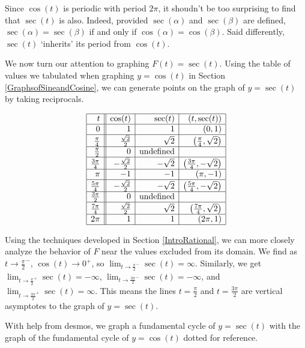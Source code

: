 \documentclass{ximera}
\begin{document}
Since $\cos(t)$ is periodic with period $2\pi$, it shoudn't be too surprising to find that $\sec(t)$ is also.  Indeed, provided $\sec(\alpha)$ and  $\sec(\beta)$ are defined, $\sec(\alpha) = \sec(\beta)$ if and only if $\cos(\alpha) = \cos(\beta)$.  Said differently,  $\sec(t)$ `inherits' its period from $\cos(t)$. 



We now turn our attention to graphing $F(t) = \sec(t)$.  Using the table of values we tabulated when graphing $y = \cos(t)$ in Section \ref{GraphsofSineandCosine}, we can generate points on the graph of $y = \sec(t)$ by taking reciprocals.


\[ \begin{array}{|r||r|r|r|} \hline
t & \cos(t) & \sec(t) & (t,\sec(t)) \\ \hline
0  & 1 & 1 & (0,1) \\ \hline
\frac{\pi}{4}  & \frac{\sqrt{2}}{2} & \sqrt{2} & \left(\frac{\pi}{4}, \sqrt{2} \right) \\ \hline 
\frac{\pi}{2}  & 0 & \text{undefined} &  \\ \hline 
\frac{3\pi}{4}  & -\frac{\sqrt{2}}{2} & -\sqrt{2} & \left(\frac{3\pi}{4}, -\sqrt{2} \right) \\ \hline 
\pi & -1 & -1 &  (\pi, -1) \\ \hline 
\frac{5\pi}{4}  & -\frac{\sqrt{2}}{2} & -\sqrt{2} & \left(\frac{5\pi}{4}, -\sqrt{2} \right) \\ \hline 
\frac{3\pi}{2}  & 0 & \text{undefined} & \\ \hline 
\frac{7\pi}{4}  & \frac{\sqrt{2}}{2} & \sqrt{2} & \left(\frac{7\pi}{4}, \sqrt{2} \right) \\ \hline 
2\pi  & 1 &  1& (2\pi, 1) \\ \hline
\end{array} \] 

Using the techniques developed in Section \ref{IntroRational}, we can more closely analyze the behavior of $F$ near the values excluded from its domain.  We find  as $t \rightarrow \frac{\pi}{2}^{-}$, $\cos(t) \rightarrow 0^{+}$, so $\lim_{t \rightarrow \frac{\pi}{2}^{-}}\sec(t) = \infty$.  Similarly, we get $\lim_{t \rightarrow \frac{\pi}{2}^{+}}\sec(t) = -\infty$, $\lim_{t \rightarrow \frac{3\pi}{2}^{-}}\sec(t) = -\infty$, and $\lim_{t \rightarrow \frac{3\pi}{2}^{+}}\sec(t)  = \infty$.  This means the lines $t = \frac{\pi}{2}$ and $t = \frac{3\pi}{2}$ are vertical asymptotes to the graph of $y = \sec(t)$.


With help from desmos, we graph a fundamental cycle of $y = \sec(t)$  with the graph of the fundamental cycle of $y = \cos(t)$ dotted for reference.  
\end{document}
